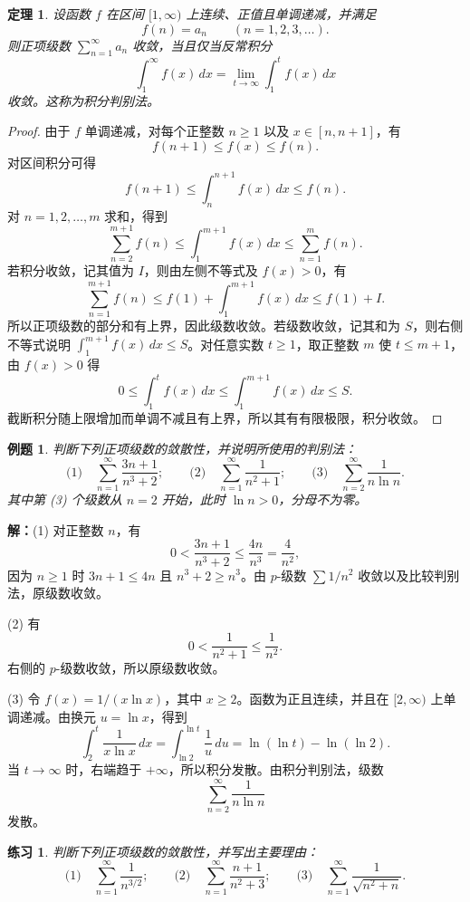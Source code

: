 \documentclass[UTF8,fontset=fandol,11pt]{ctexart}
\newtheorem{theorem}[definition]{定理}
\newtheorem{example}[definition]{例题}
\newtheorem{exercise}[definition]{练习}
\begin{document}
\begin{theorem}
设函数 $f$ 在区间 $[1,\infty)$ 上连续、正值且单调递减，并满足
\[
f(n)=a_n\qquad(n=1,2,3,\ldots).
\]
则正项级数 $\sum_{n=1}^{\infty}a_n$ 收敛，当且仅当反常积分
\[
\int_{1}^{\infty}f(x)\,dx
=\lim_{t\to\infty}\int_{1}^{t}f(x)\,dx
\]
收敛。这称为积分判别法。\label{thm:integral-test}
\end{theorem}
\begin{proof}
由于 $f$ 单调递减，对每个正整数 $n\geq1$ 以及 $x\in[n,n+1]$，有
\[
f(n+1)\leq f(x)\leq f(n).
\]
对区间积分可得
\[
f(n+1)\leq\int_n^{n+1}f(x)\,dx\leq f(n).
\]
对 $n=1,2,\ldots,m$ 求和，得到
\[
\sum_{n=2}^{m+1}f(n)\leq\int_1^{m+1}f(x)\,dx\leq\sum_{n=1}^{m}f(n).
\]
若积分收敛，记其值为 $I$，则由左侧不等式及 $f(x)>0$，有
\[
\sum_{n=1}^{m+1}f(n)\leq f(1)+\int_1^{m+1}f(x)\,dx\leq f(1)+I.
\]
所以正项级数的部分和有上界，因此级数收敛。若级数收敛，记其和为 $S$，则右侧不等式说明 $\int_1^{m+1}f(x)\,dx\leq S$。对任意实数 $t\geq1$，取正整数 $m$ 使 $t\leq m+1$，由 $f(x)>0$ 得
\[
0\leq\int_1^t f(x)\,dx\leq\int_1^{m+1}f(x)\,dx\leq S.
\]
截断积分随上限增加而单调不减且有上界，所以其有有限极限，积分收敛。
\end{proof}
\begin{example}
判断下列正项级数的敛散性，并说明所使用的判别法：
\[
\text{(1)}\quad\sum_{n=1}^{\infty}\frac{3n+1}{n^3+2};
\qquad
\text{(2)}\quad\sum_{n=1}^{\infty}\frac{1}{n^2+1};
\qquad
\text{(3)}\quad\sum_{n=2}^{\infty}\frac{1}{n\ln n}.
\]
其中第 (3) 个级数从 $n=2$ 开始，此时 $\ln n>0$，分母不为零。
\end{example}
\par\noindent\textbf{解：}(1) 对正整数 $n$，有
\[
0<\frac{3n+1}{n^3+2}\leq\frac{4n}{n^3}=\frac{4}{n^2},
\]
因为 $n\geq1$ 时 $3n+1\leq4n$ 且 $n^3+2\geq n^3$。由 $p$-级数 $\sum 1/n^2$ 收敛以及比较判别法，原级数收敛。

(2) 有
\[
0<\frac{1}{n^2+1}\leq\frac{1}{n^2}.
\]
右侧的 $p$-级数收敛，所以原级数收敛。

(3) 令 $f(x)=1/(x\ln x)$，其中 $x\geq2$。函数为正且连续，并且在 $[2,\infty)$ 上单调递减。由换元 $u=\ln x$，得到
\[
\int_2^t\frac{1}{x\ln x}\,dx
=\int_{\ln2}^{\ln t}\frac{1}{u}\,du
=\ln(\ln t)-\ln(\ln2).
\]
当 $t\to\infty$ 时，右端趋于 $+\infty$，所以积分发散。由积分判别法，级数
\[
\sum_{n=2}^{\infty}\frac{1}{n\ln n}
\]
发散。\par
\begin{exercise}
\label{mathagent:exercise:0f13776c11d825df9fdf2c3c249691355909a96d5e874285ceb15e0c4116d477}
判断下列正项级数的敛散性，并写出主要理由：
\[
\text{(1)}\quad\sum_{n=1}^{\infty}\frac{1}{n^{3/2}};
\qquad
\text{(2)}\quad\sum_{n=1}^{\infty}\frac{n+1}{n^2+3};
\qquad
\text{(3)}\quad\sum_{n=1}^{\infty}\frac{1}{\sqrt{n^2+n}}.
\]

\end{exercise}
\end{document}
